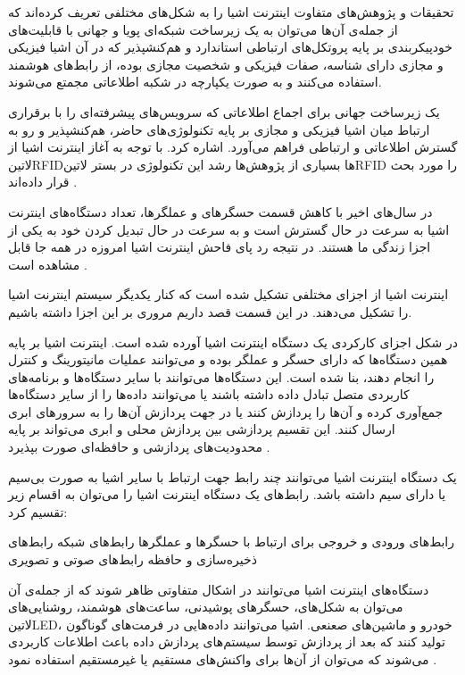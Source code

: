 تحقیقات و پژوهش‌های متفاوت اینترنت اشیا را به شکل‌های مختلفی تعریف کرده‌اند که از جمله‌ی آن‌ها می‌توان به
یک زیرساخت شبکه‌ای پویا و جهانی با قابلیت‌های خودپیکربندی بر پایه پروتکل‌های ارتباطی استاندارد و هم‌کنشپذیر که در آن اشیا فیزیکی و مجازی دارای شناسه، صفات فیزیکی
و شخصیت مجازی بوده، از رابط‌های هوشمند استفاده می‌کنند و به صورت یکپارچه در شکبه اطلاعاتی مجمتع می‌شوند.

یک زیرساخت جهانی برای اجماع اطلاعاتی که سرویس‌های پیشرفته‌ای را با برقراری ارتباط میان اشیا فیزیکی و مجازی بر پایه تکنولوژی‌های حاضر، هم‌کنشپذیر و رو به گسترش اطلاعاتی
و ارتباطی فراهم می‌آورد.
اشاره کرد. با توجه به آغاز اینترنت اشیا از ‌لاتین{RFID}ها بسیاری از پژوهش‌ها رشد این تکنولوژی در بستر ‌لاتین{RFID} را مورد بحث قرار داده‌اند
.

در سال‌های اخیر با کاهش قسمت حسگرهای و عملگرها، تعداد دستگاه‌های اینترنت اشیا به سرعت در حال گسترش است و به سرعت در حال تبدیل کردن خود به یکی از اجزا زندگی ما هستند.
در نتیجه رد پای فاحش اینترنت اشیا امروزه در همه جا قابل مشاهده است
.


اینترنت اشیا از اجزای مختلفی تشکیل شده است که کنار یکدیگر سیستم اینترنت اشیا را تشکیل می‌دهند. در این قسمت قصد داریم مروری بر این اجزا داشته باشیم.

در شکل  اجزای کارکردی یک دستگاه اینترنت اشیا آورده شده است.
اینترنت اشیا بر پایه همین دستگاه‌ها که دارای حسگر و عملگر بوده و می‌توانند عملیات مانیتورینگ و کنترل را انجام دهند، بنا شده است.
این دستگاه‌ها می‌توانند با سایر دستگاه‌ها و برنامه‌های کاربردی متصل تبادل داده داشته باشند یا می‌توانند داده‌ها را از سایر دستگاه‌ها جمع‌آوری کرده
و آن‌ها را پردازش کنند یا در جهت پردازش آن‌ها را به سرورهای ابری ارسال کنند. این تقسیم پردازشی بین پردازش محلی و ابری می‌تواند بر پایه محدودیت‌های پردازشی و حافظه‌ای
صورت بپذیرد
.

یک دستگاه اینترنت اشیا می‌توانند چند رابط جهت ارتباط با سایر اشیا به صورت بی‌سیم یا دارای سیم داشته باشد.
رابط‌های یک دستگاه اینترنت اشیا را می‌توان به اقسام زیر تقسیم کرد:

 رابط‌های ورودی و خروجی برای ارتباط با حسگرها و عملگرها
 رابط‌های شبکه
 رابط‌های ذخیره‌سازی و حافظه
 رابط‌های صوتی و تصویری

دستگاه‌های اینترنت اشیا می‌توانند در اشکال متفاوتی ظاهر شوند که از جمله‌ی آن می‌توان به شکل‌های، حسگرهای پوشیدنی، ساعت‌های هوشمند،
روشنایی‌های ‌لاتین{LED}، خودرو و ماشین‌های صعنعی. اشیا می‌توانند داده‌هایی در فرمت‌های گوناگون تولید کنند که بعد از پردازش توسط سیستم‌های
پردازش داده باعث اطلاعات کاربردی می‌شوند که می‌توان از آن‌ها برای واکنش‌های مستقیم یا غیرمستقیم استفاده نمود
.


